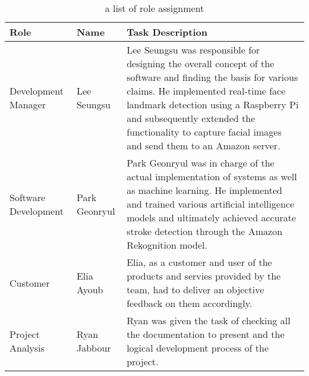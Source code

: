\documentclass[conference]{IEEEtran}
\begin{document}
\begin{abstract}
\end{abstract}


\begin{table}[h]
    \caption{a list of role assignment}
    \begin{tabular}{|p{2.6cm}|p{1.7cm}|p{3.4cm}|}
    \hline
    Role & Name & Task Description \\ \hline
      Development Manager & Lee Seungsu & Lee Seungsu was responsible for designing the overall concept of the software and finding the basis for various claims. He implemented real-time face landmark detection using a Raspberry Pi and subsequently extended the functionality to capture facial images and send them to an Amazon server.\\ \hline
      Software Development & Park Geonryul & Park Geonryul was in charge of the actual implementation of systems as well as machine learning. He implemented and trained various artificial intelligence models and ultimately achieved accurate stroke detection through the Amazon Rekognition model.\\ \hline
      Customer & Elia Ayoub & Elia, as a customer and user of the products and servies provided by the team, had to deliver an objective feedback on them accordingly.\\ \hline
      Project Analysis & Ryan Jabbour & Ryan was given the task of checking all the documentation to present and the logical development process of the project.\\ \hline
    \end{tabular}
    \end{table}












\end{document}
